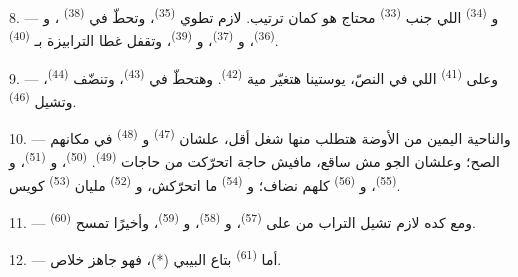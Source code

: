 \VUsaut{5.0mm}
\VUsaut{3.0mm}

8. --- و \textsuperscript{(34)} اللي جنب 
\textsuperscript{(33)} محتاج هو كمان ترتيب. لازم تطوي 
\textsuperscript{(35)}، وتحطّ في  \textsuperscript{(38)}
، و \textsuperscript{(36)}، و
\textsuperscript{(37)}، و \textsuperscript{(39)}، وتقفل غطا الترابيزة
بـ \textsuperscript{(40)}.

9. --- وعلى  \textsuperscript{(41)} اللي في النصّ،
يوستينا هتغيّر مية  \textsuperscript{(42)}. وهتحطّ  في
 \textsuperscript{(43)}، وتنضّف  \textsuperscript{(44)}،
وتشيل  \textsuperscript{(46)}.

10. --- والناحية اليمين من الأوضة هتطلب منها شغل أقل، علشان
 \textsuperscript{(47)} و \textsuperscript{(48)} في مكانهم
الصح؛ وعلشان الجو مش ساقع، مافيش حاجة اتحرّكت من حاجات 
\textsuperscript{(49)}.  \textsuperscript{(50)}، و
\textsuperscript{(51)}، و \textsuperscript{(55)}، و
\textsuperscript{(56)} كلهم نضاف؛ و \textsuperscript{(54)} ما اتحرّكش،
و \textsuperscript{(52)} مليان  \textsuperscript{(53)} كويس.



11. --- ومع كده لازم تشيل التراب من على  \textsuperscript{(57)}،
و \textsuperscript{(58)}، و \textsuperscript{(59)}،
وأخيرًا تمسح  \textsuperscript{(60)}.

12. --- أما  \textsuperscript{(61)} بتاع البيبي (*)، فهو جاهز خلاص.

\VUsaut{5.0mm}
\VUsaut{3.0mm}


